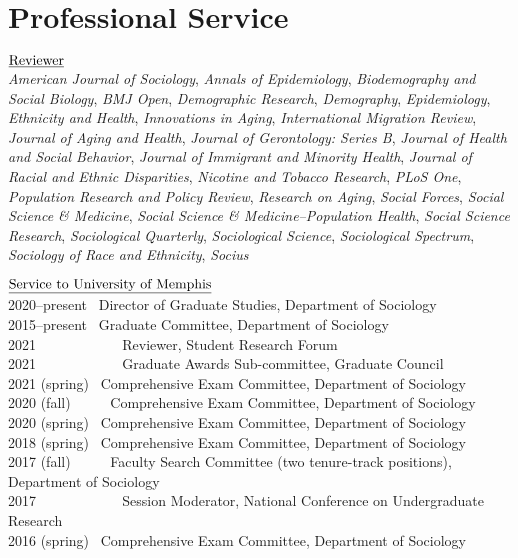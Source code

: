 \documentclass[11pt,]{article}
\begin{document}
\setlength{\leftskip}{0pt}

\hypertarget{professional-service}{%
\section{Professional Service}\label{professional-service}}

\(\text{\underline{Reviewer}}\)\\
\emph{American Journal of Sociology}, \emph{Annals of Epidemiology},
\emph{Biodemography and Social Biology}, \emph{BMJ Open},
\emph{Demographic Research}, \emph{Demography}, \emph{Epidemiology},
\emph{Ethnicity and Health}, \emph{Innovations in Aging},
\emph{International Migration Review}, \emph{Journal of Aging and
Health}, \emph{Journal of Gerontology: Series B}, \emph{Journal of
Health and Social Behavior}, \emph{Journal of Immigrant and Minority
Health}, \emph{Journal of Racial and Ethnic Disparities}, \emph{Nicotine
and Tobacco Research}, \emph{PLoS One}, \emph{Population Research and
Policy Review}, \emph{Research on Aging}, \emph{Social Forces},
\emph{Social Science \& Medicine}, \emph{Social Science \&
Medicine--Population Health}, \emph{Social Science Research},
\emph{Sociological Quarterly}, \emph{Sociological Science},
\emph{Sociological Spectrum}, \emph{Sociology of Race and Ethnicity},
\emph{Socius}

\(\text{\underline{Service to University of Memphis}}\)\\
2020--present ~Director of Graduate Studies, Department of Sociology\\
2015--present ~Graduate Committee, Department of Sociology\\
2021 ~ ~ ~ ~ ~ ~ ~ Reviewer, Student Research Forum\\
2021 ~ ~ ~ ~ ~ ~ ~ Graduate Awards Sub-committee, Graduate Council\\
2021 (spring) ~Comprehensive Exam Committee, Department of Sociology\\
2020 (fall) ~ ~ ~ Comprehensive Exam Committee, Department of
Sociology\\
2020 (spring) ~Comprehensive Exam Committee, Department of Sociology\\
2018 (spring) ~Comprehensive Exam Committee, Department of Sociology\\
2017 (fall) ~ ~ ~ Faculty Search Committee (two tenure-track positions),
Department of Sociology\\
2017 ~ ~ ~ ~ ~ ~ ~ Session Moderator, National Conference on
Undergraduate Research\\
2016 (spring) ~Comprehensive Exam Committee, Department of Sociology
\end{document}
